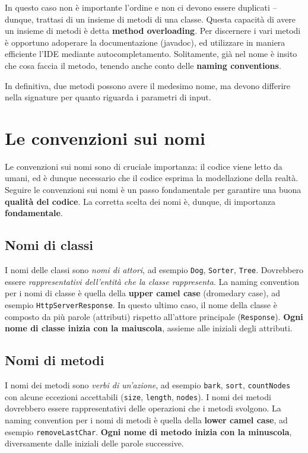 \documentclass[\fontsizeclass,twocolumn]{\classname}
\theoremstyle{definition}
\theoremstyle{definition}
\begin{document}
In questo caso non è importante l'ordine e non ci devono essere duplicati \---
dunque, trattasi di un insieme di metodi di una classe. Questa capacità di
avere un insieme di metodi è detta \textbf{method overloading}. Per discernere
i vari metodi è opportuno adoperare la documentazione (javadoc), ed utilizzare in
maniera efficiente l'IDE mediante autocompletamento. Solitamente, già nel nome
è insito che cosa faccia il metodo, tenendo anche conto delle \textbf{naming
conventions}.

In definitiva, due metodi possono avere il medesimo nome, ma devono differire
nella signature per quanto riguarda i parametri di input.

\section{Le convenzioni sui nomi}

Le convenzioni sui nomi sono di cruciale importanza: il codice viene letto da
umani, ed è dunque necessario che il codice esprima la modellazione della
realtà. Seguire le convenzioni sui nomi è un passo fondamentale per garantire
una buona \textbf{qualità del codice}. La corretta scelta dei nomi è, dunque,
di importanza \textbf{fondamentale}.

\subsection{Nomi di classi}

I nomi delle classi sono \emph{nomi di attori}, ad esempio \texttt{Dog},
\texttt{Sorter}, \texttt{Tree}. Dovrebbero essere \emph{rappresentativi
dell'entità che la classe rappresenta}. La naming convention per i nomi di
classe è quella della \textbf{upper camel case} (dromedary case), ad esempio
\texttt{HttpServerResponse}. In questo ultimo caso, il nome della classe è
composto da più parole (attributi) rispetto all'attore principale (\texttt{Response}).
\textbf{Ogni nome di classe inizia con la maiuscola}, assieme alle iniziali
degli attributi.

\subsection{Nomi di metodi}

I nomi dei metodi sono \emph{verbi di un'azione}, ad esempio \texttt{bark},
\texttt{sort}, \texttt{countNodes} con alcune eccezioni accettabili
(\texttt{size}, \texttt{length}, \texttt{nodes}). I nomi dei metodi dovrebbero
essere rappresentativi delle operazioni che i metodi svolgono. La naming
convention per i nomi di metodi è quella della \textbf{lower camel case}, ad
esempio \texttt{removeLastChar}. \textbf{Ogni nome di metodo inizia con la
minuscola}, diversamente dalle iniziali delle parole successive.
\end{document}
